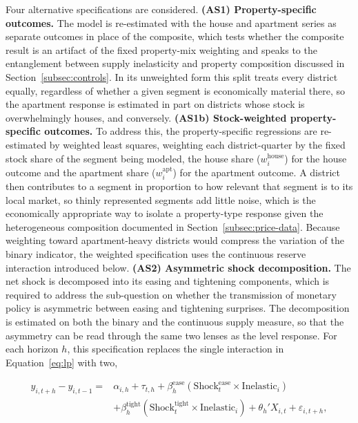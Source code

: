 \documentclass[a4paper,12pt, headsepline]{scrartcl}
\numberwithin{equation}{section}
\begin{document}
Four alternative specifications are considered. \textbf{(AS1) Property-specific outcomes.} The model is re-estimated with the house and apartment series as separate outcomes in place of the composite, which tests whether the composite result is an artifact of the fixed property-mix weighting and speaks to the entanglement between supply inelasticity and property composition discussed in Section~\ref{subsec:controls}. In its unweighted form this split treats every district equally, regardless of whether a given segment is economically material there, so the apartment response is estimated in part on districts whose stock is overwhelmingly houses, and conversely. \textbf{(AS1b) Stock-weighted property-specific outcomes.} To address this, the property-specific regressions are re-estimated by weighted least squares, weighting each district-quarter by the fixed stock share of the segment being modeled, the house share ($w^{\text{house}}_i$) for the house outcome and the apartment share ($w^{\text{apt}}_i$) for the apartment outcome. A district then contributes to a segment in proportion to how relevant that segment is to its local market, so thinly represented segments add little noise, which is the economically appropriate way to isolate a property-type response given the heterogeneous composition documented in Section~\ref{subsec:price-data}. Because weighting toward apartment-heavy districts would compress the variation of the binary indicator, the weighted specification uses the continuous reserve interaction introduced below. \textbf{(AS2) Asymmetric shock decomposition.} The net shock is decomposed into its easing and tightening components, which is required to address the sub-question on whether the transmission of monetary policy is asymmetric between easing and tightening surprises. The decomposition is estimated on both the binary and the continuous supply measure, so that the asymmetry can be read through the same two lenses as the level response. For each horizon $h$, this specification replaces the single interaction in Equation~\ref{eq:lp} with two,

\begin{equation}
	\begin{split}
		y_{i,t+h} - y_{i,t-1} = {}& \alpha_{i,h} + \tau_{t,h}
			+ \beta_h^{\text{ease}} \left( \text{Shock}^{\text{ease}}_t \times \text{Inelastic}_i \right) \\
			&+ \beta_h^{\text{tight}} \left( \text{Shock}^{\text{tight}}_t \times \text{Inelastic}_i \right)
			+ \theta_h' X_{i,t} + \varepsilon_{i,t+h},
	\end{split} \label{eq:lp-asym}
\end{equation}
\end{document}
